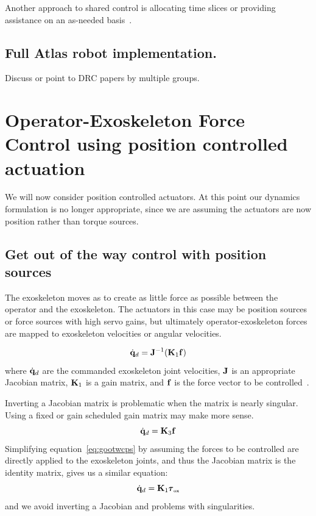 \documentclass[letterpaper,12pt,fullpage]{article}
\newcommand{\ox}{{\mbox {\tiny ox}}}
\begin{document}
Another approach to shared control is allocating time slices or providing assistance
on an as-needed basis~\cite{IEEE07140030}.

\subsection{Full Atlas robot implementation.}

Discuss or point to DRC papers by multiple groups.

\section{Operator-Exoskeleton Force Control using position controlled actuation}

We will now consider position controlled actuators.
At this point our dynamics formulation is no longer appropriate, since we
are assuming the actuators are now position rather than torque sources.

\subsection{Get out of the way control with position sources}

The exoskeleton moves as to create as little force as possible between the
operator and the exoskeleton. The actuators in this case may be position sources or
force sources with high servo gains,
but ultimately operator-exoskeleton forces are mapped
to exoskeleton velocities or angular velocities.

\begin{equation}
\dot{{\bf q}}_d = {\bf J}^{-1} ({\bf K}_1 {\bf f})
\label{eq:gootwcps}
\end{equation}
where $\dot{{\bf q}}_d$ are the commanded exoskeleton joint velocities,
${\bf J}$ is an appropriate Jacobian matrix, ${\bf K}_1$ is a gain matrix,
and ${\bf f}$ is the force vector to be controlled~\cite{IEEE06990981}.

Inverting a Jacobian matrix is problematic when the matrix is
nearly singular.
Using a fixed or gain scheduled gain matrix may make more sense.
\begin{equation}
\dot{{\bf q}}_d = {\bf K}_3 {\bf f}
\end{equation}
Simplifying equation~\ref{eq:gootwcps}
by assuming the forces to be controlled
are directly applied to the exoskeleton joints, and thus the Jacobian matrix
is the identity matrix, gives us a similar equation:
\begin{equation}
\dot{\vq}_d = \mK_1 \vtau_{\ox}
\end{equation}
and we avoid inverting a Jacobian and problems with singularities.
\end{document}
